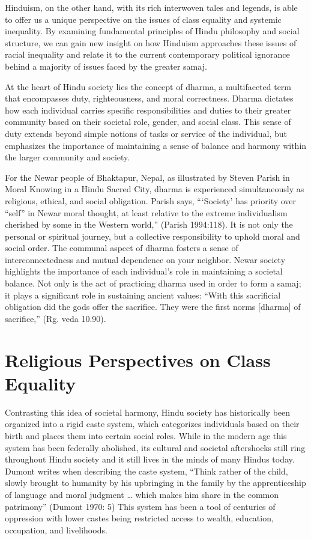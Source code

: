 \documentclass[
	letterpaper, %
	10pt, %
	unnumberedsections, %
	twoside, %
]{LTJournalArticle}
\begin{document}
Hinduism, on the other hand, with its rich interwoven tales and legends, is able to offer us a unique perspective on the issues of class equality and systemic inequality. By examining fundamental principles of Hindu philosophy and social structure, we can gain new insight on how Hinduism approaches these issues of racial inequality and relate it to the current contemporary political ignorance behind a majority of issues faced by the greater samaj.

At the heart of Hindu society lies the concept of dharma, a multifaceted term that encompasses duty, righteousness, and moral correctness. Dharma dictates how each individual carries specific responsibilities and duties to their greater community based on their societal role, gender, and social class. This sense of duty extends beyond simple notions of tasks or service of the individual, but emphasizes the importance of maintaining a sense of balance and harmony within the larger community and society.

For the Newar people of Bhaktapur, Nepal, as illustrated by Steven Parish in Moral Knowing in a Hindu Sacred City, dharma is experienced simultaneously as religious, ethical, and social obligation. Parish says, “‘Society’ has priority over “self” in Newar moral thought, at least relative to the extreme individualism cherished by some in the Western world,” (Parish 1994:118). It is not only the personal or spiritual journey, but a collective responsibility to uphold moral and social order. The communal aspect of dharma fosters a sense of interconnectedness and mutual dependence on your neighbor. Newar society highlights the importance of each individual’s role in maintaining a societal balance. Not only is the act of practicing dharma used in order to form a samaj; it plays a significant role in sustaining ancient values: “With this sacrificial obligation did the gods offer the sacrifice. They were the first norms [dharma] of sacrifice,” (Rg. veda 10.90).

\section{Religious Perspectives on Class Equality}
Contrasting this idea of societal harmony, Hindu society has historically been organized into a rigid caste system, which categorizes individuals based on their birth and places them into certain social roles. While in the modern age this system has been federally abolished, its cultural and societal aftershocks still ring throughout Hindu society and it still lives in the minds of many Hindus today. Dumont writes when describing the caste system, “Think rather of the child, slowly brought to humanity by his upbringing in the family by the apprenticeship of language and moral judgment … which makes him share in the common patrimony” (Dumont 1970: 5) This system has been a tool of centuries of oppression with lower castes being restricted access to wealth, education, occupation, and livelihoods.
\end{document}
